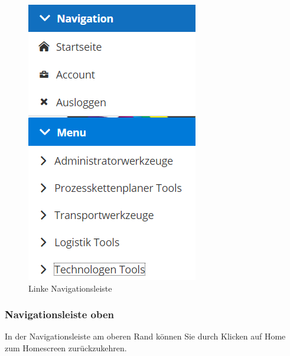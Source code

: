 \documentclass[enabledeprecatedfontcommands,fontsize=12pt,paper=a4,twoside]{scrartcl}
\begin{document}
\begin{figure}[h!]
\begin{center}
 \includegraphics[width=\textwidth]{screenshots/allgemein/navigationlinks.png}
  \caption{Linke Navigationsleiste}
  \label{fig:boat1}
\end{center}
\end{figure}


\subsubsection{Navigationsleiste oben}
In der Navigationsleiste am oberen Rand können Sie durch Klicken auf Home zum Homescreen zurückzukehren.  \\
\end{document}
